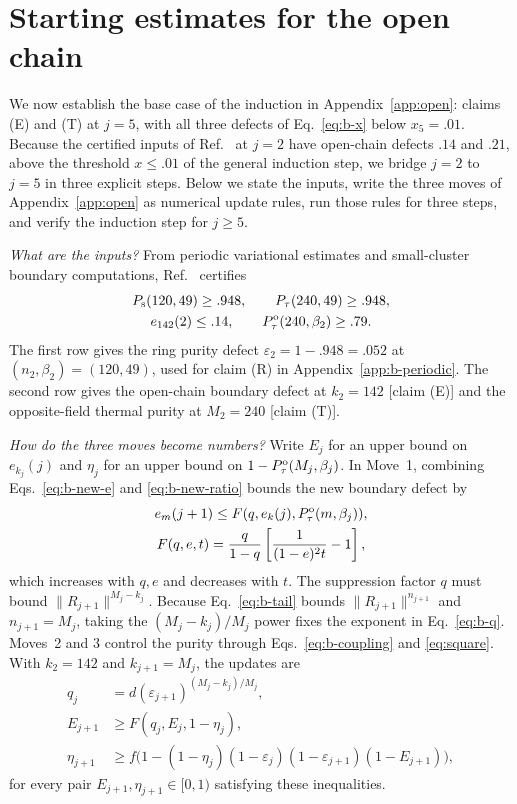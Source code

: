 \documentclass[aps,prl,reprint,amsmath,amssymb,nofootinbib,raggedbottom]{revtex4-2}
\begin{document}
\section{Starting estimates for the open chain}\label{app:b-iteration}
We now establish the base case of the induction in Appendix~\ref{app:open}:
claims (E) and (T) at $j=5$, with all three defects of Eq.~\eqref{eq:b-x} below
$x_5=.01$. Because the certified inputs of Ref.~\cite{boundary} at $j=2$ have
open-chain defects $.14$ and $.21$, above the threshold $x\le.01$ of the
general induction step, we bridge $j=2$ to $j=5$ in three explicit steps. Below
we state the inputs, write the three moves of Appendix~\ref{app:open} as
numerical update rules, run those rules for three steps, and verify the
induction step for $j\ge5$.

\emph{What are the inputs?} From periodic variational estimates and
small-cluster boundary computations, Ref.~\cite{boundary} certifies
\begin{equation}
 \begin{gathered}
 P_{\mathrm s}(120,49)\ge .948,\qquad P_{\tau}(240,49)\ge .948,\\
 e_{142}(2)\le .14,\qquad P_{\tau}^{\mathrm{o}}(240,\beta_{2})\ge .79.
 \end{gathered}
 \label{eq:b-seeds}
\end{equation}
The first row gives the ring purity defect $\varepsilon_2=1-.948=.052$ at
$(n_2,\beta_2)=(120,49)$, used for claim (R) in
Appendix~\ref{app:b-periodic}. The second row gives the open-chain boundary
defect at $k_2=142$ [claim (E)] and the opposite-field thermal purity at
$M_2=240$ [claim (T)].

\emph{How do the three moves become numbers?} Write $E_j$ for an upper bound on
$e_{k_j}(j)$ and $\eta_j$ for an upper bound on $1-P_{\tau}^{\mathrm{o}}(M_j,\beta_j)$.
In Move~1, combining Eqs.~\eqref{eq:b-new-e} and \eqref{eq:b-new-ratio} bounds
the new boundary defect by
\begin{equation}
 \begin{gathered}
 e_m(j+1)\le F(q,e_k(j),P_{\tau}^{\mathrm{o}}(m,\beta_j)),\\
 F(q,e,t)=\frac{q}{1-q}\left[\frac1{(1-e)^2t}-1\right],
 \end{gathered}
 \label{eq:b-F}
\end{equation}
which increases with $q,e$ and decreases with $t$. The suppression factor $q$
must bound $\|R_{j+1}\|^{M_j-k_j}$. Because Eq.~\eqref{eq:b-tail} bounds
$\|R_{j+1}\|^{n_{j+1}}$ and $n_{j+1}=M_j$, taking the $(M_j-k_j)/M_j$ power
fixes the exponent in Eq.~\eqref{eq:b-q}. Moves~2 and 3 control the purity
through Eqs.~\eqref{eq:b-coupling} and \eqref{eq:square}. With $k_2=142$ and
$k_{j+1}=M_j$, the updates are
\begin{align}
 q_j&=d(\varepsilon_{j+1})^{(M_j-k_j)/M_j},\label{eq:b-q}\\
 E_{j+1}&\ge F(q_j,E_j,1-\eta_j),\label{eq:b-E-update}\\
 \eta_{j+1}&\ge f\bigl(1-(1-\eta_j)(1-\varepsilon_j)
                   (1-\varepsilon_{j+1})(1-E_{j+1})\bigr),
 \label{eq:b-eta-update}
\end{align}
for every pair $E_{j+1},\eta_{j+1}\in[0,1)$ satisfying these inequalities.
\end{document}
